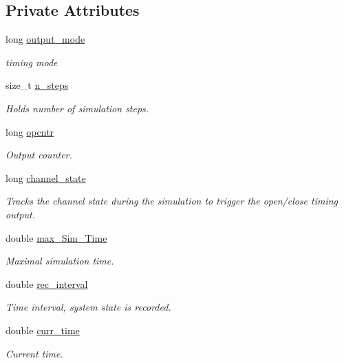 \subsection*{Private Attributes}
\begin{DoxyCompactItemize}
\item 
long \hyperlink{classnw_1_1_gillespie___sys_aa5b4943f29fb0276596ace75e384565e}{output\+\_\+mode}
\begin{DoxyCompactList}\small\item\em timing mode \end{DoxyCompactList}\item 
size\+\_\+t \hyperlink{classnw_1_1_gillespie___sys_a56184d8a2afdebca9cfe6e08e191fe51}{n\+\_\+steps}
\begin{DoxyCompactList}\small\item\em Holds number of simulation steps. \end{DoxyCompactList}\item 
long \hyperlink{classnw_1_1_gillespie___sys_a31f847a062a1cdc9b4a7eed103447da7}{opcntr}
\begin{DoxyCompactList}\small\item\em Output counter. \end{DoxyCompactList}\item 
long \hyperlink{classnw_1_1_gillespie___sys_a2e7300d68c9faccf444866e67842133f}{channel\+\_\+state}
\begin{DoxyCompactList}\small\item\em Tracks the channel state during the simulation to trigger the open/close timing output. \end{DoxyCompactList}\item 
double \hyperlink{classnw_1_1_gillespie___sys_a232687e1809761fea124e81aa7273f3c}{max\+\_\+\+Sim\+\_\+\+Time}
\begin{DoxyCompactList}\small\item\em Maximal simulation time. \end{DoxyCompactList}\item 
double \hyperlink{classnw_1_1_gillespie___sys_a0de156c39c87a334da7477cb2a9c02cf}{rec\+\_\+interval}
\begin{DoxyCompactList}\small\item\em Time interval, system state is recorded. \end{DoxyCompactList}\item 
double \hyperlink{classnw_1_1_gillespie___sys_ac83bb4eaee1f8b46610a8243a83fb3ad}{curr\+\_\+time}
\begin{DoxyCompactList}\small\item\em Current time. \end{DoxyCompactList}\item 

\end{DoxyCompactItemize}
